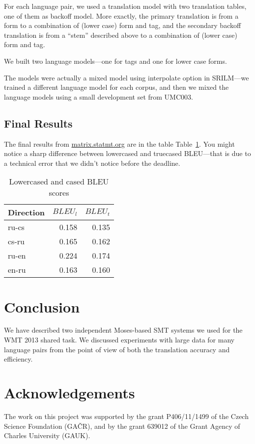 \documentclass[11pt,letterpaper]{article}
\def\Tref#1{Table~\ref{#1}}
\begin{document}
For each language pair, we used a translation model with two translation tables, one of them as backoff model. More exactly, the primary translation is from a form to a combination of (lower case) form and tag, and the secondary backoff translation is from a ``stem'' described above to a combination of (lower case) form and tag.

We built two language models---one for tags and one for lower case forms.

The models were actually a mixed model using interpolate option in SRILM---we trained a different language model for each corpus, and then we mixed the language models using a small development set from UMC003.


\subsection{Final Results}

The final results from  \url{matrix.statmt.org} are in the table \Tref{tab:finalbleukarel}. You might notice a sharp difference between lowercased and truecased BLEU---that is due to a technical error that we didn't notice before the deadline. %

\begin{table}[htbl]
\begin{center}
\begin{tabular}{l | r r}
Direction & $BLEU_l$ & $BLEU_t$ \\
\hline
ru-cs & 0.158 & 0.135 \\
cs-ru & 0.165 & 0.162 \\
ru-en & 0.224 & 0.174 \\
en-ru & 0.163 & 0.160 \\
\end{tabular}
\end{center}
\caption{Lowercased and cased BLEU scores}
\label{tab:finalbleukarel}
\end{table}

\section{Conclusion}
\label{sec:concl}

We have described two independent Moses-based SMT systems we used for the WMT 2013 shared task. We discussed experiments with large data for many language pairs from the point of view of both the translation accuracy and efficiency.

\section*{Acknowledgements}
\label{sec:ack}

The work on this project was supported by the grant
P406/11/1499 of the Czech Science Foundation (GAČR),
and by the grant
639012 of the Grant Agency of Charles University (GAUK).




\end{document}
